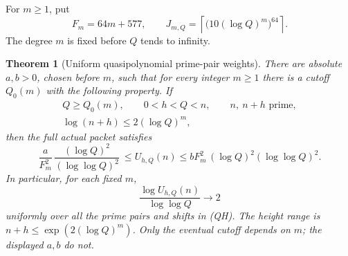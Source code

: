 \documentclass[11pt]{article}
\newtheorem{theorem}{Theorem}[section]
\begin{document}
For \(m\geq1\), put
\[
             F_m=64m+577,\qquad
             J_{m,Q}=\left\lceil
                    \bigl(10(\log Q)^m\bigr)^{64}\right\rceil .
\]
The degree \(m\) is fixed before \(Q\) tends to infinity.

\begin{theorem}[Uniform quasipolynomial prime-pair weights]
\label{thm:quasipolynomial-pair-weights}
There are absolute \(a,b>0\), chosen before \(m\), such that
for every integer \(m\geq1\) there is a cutoff \(Q_0(m)\)
with the following property. If
\[
 \begin{gathered}
 Q\geq Q_0(m),\qquad 0<h<Q<n,\qquad n,\ n+h\text{ prime},\\
                  \log(n+h)\leq2(\log Q)^m ,
 \end{gathered}
 \tag{QH}
\]
then the full actual packet satisfies
\[
 \frac{a}{F_m^2}\,
      \frac{(\log Q)^2}{(\log\log Q)^2}
 \ \leq U_{h,Q}(n)\leq
 bF_m^2\,(\log Q)^2(\log\log Q)^2 .
 \tag{QW}
\]
In particular, for each fixed \(m\),
\[
                 \frac{\log U_{h,Q}(n)}{\log\log Q}\longrightarrow2
 \tag{QE}
\]
uniformly over all the prime pairs and shifts in (QH).
The height range is \(n+h\leq\exp(2(\log Q)^m)\).
Only the eventual cutoff depends on \(m\); the displayed \(a,b\)
do not.
\end{theorem}
\end{document}
